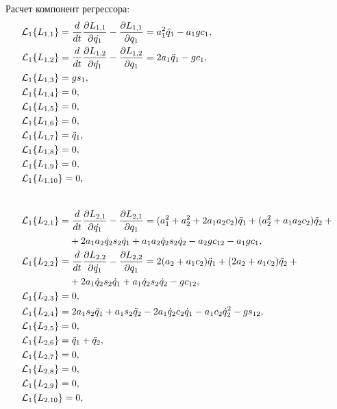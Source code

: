 Расчет компонент регрессора:
\begin{align}
    & \mathcal{L}_1 \{ L_{1,1} \} = \frac{d}{dt}\frac{\partial L_{1,1}}{\partial\dot{q_1}} - \frac{\partial L_{1,1}}{\partial q_1} = a_1^2 \ddot{q}_1 - a_1 g c_1, \label{eq_first_regr_comp_for_2}
    \\
    & \mathcal{L}_1 \{ L_{1,2} \} = \frac{d}{dt}\frac{\partial L_{1,2}}{\partial\dot{q_1}} - \frac{\partial L_{1,2}}{\partial q_1} = 2 a_1 \ddot{q}_1 - g c_1,
    \\
    & \mathcal{L}_1 \{ L_{1,3} \} = g s_1,
    \\
    & \mathcal{L}_1 \{ L_{1,4} \} = 0,
    \\
    & \mathcal{L}_1 \{ L_{1,5} \} = 0,
    \\
    & \mathcal{L}_1 \{ L_{1,6} \} = 0,
    \\
    & \mathcal{L}_1 \{ L_{1,7} \} = \ddot{q}_1,
    \\
    & \mathcal{L}_1 \{ L_{1,8} \} = 0,
    \\
    & \mathcal{L}_1 \{ L_{1,9} \} = 0,
    \\
    & \mathcal{L}_1 \{ L_{1,10} \} = 0,
    \\[0.8cm]
    & \mathcal{L}_1 \{ L_{2,1} \} = \frac{d}{dt}\frac{\partial L_{2,1}}{\partial\dot{q_1}} - \frac{\partial L_{2,1}}{\partial q_1} = (a_1^2 + a_2^2 + 2 a_1 a_2 c_2) \ddot{q}_1 + (a_2^2 + a_1 a_2 c_2 )\ddot{q}_2 + {} \notag
    \\
    &\phantom{\mathcal{L}_1 \{ L_{2,1} \} =} + 2 a_1 a_2 \dot{q}_2 s_2 \dot{q}_1 + a_1 a_2 \dot{q}_2 s_2 \dot{q}_2 - a_2 g c_{12} - a_1 g c_1,
    \\
    & \mathcal{L}_1 \{ L_{2,2} \} = \frac{d}{dt}\frac{\partial L_{2,2}}{\partial\dot{q_1}} - \frac{\partial L_{2,2}}{\partial q_1} = 2 (a_2 + a_1 c_2) \ddot{q}_1 + (2 a_2 + a_1 c_2) \ddot{q}_2 + {} \notag
    \\
    &\phantom{\mathcal{L}_1 \{ L_{2,2} \} =} + 2 a_1 \dot{q}_2 s_2 \dot{q}_1 + a_1 \dot{q}_2 s_2 \dot{q}_2 - g c_{12},
    \\
    & \mathcal{L}_1 \{ L_{2,3} \} = 0,
    \\
    &\mathcal{L}_1 \{ L_{2,4} \} = 2 a_1 s_2 \ddot{q}_1 + a_1 s_2 \ddot{q}_2 - 2 a_1 \dot{q}_2 c_2 \dot{q}_1 - a_1 c_2 \dot{q}_2^2 - g s_{12},
    \\
    & \mathcal{L}_1 \{ L_{2,5} \} = 0,
    \\
    & \mathcal{L}_1 \{ L_{2,6} \} = \ddot{q}_1 + \ddot{q}_2,
    \\
    & \mathcal{L}_1 \{ L_{2,7} \} = 0,
    \\
    & \mathcal{L}_1 \{ L_{2,8} \} = 0,
    \\
    & \mathcal{L}_1 \{ L_{2,9} \} = 0,
    \\
    & \mathcal{L}_1 \{ L_{2,10} \} = 0,
\end{align}
